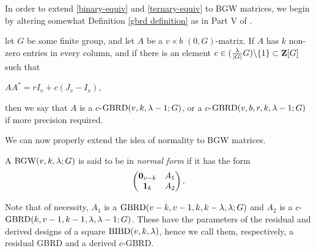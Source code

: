 \documentclass[../../../main]{subfiles}
\begin{document}
 In order to extend \ref{binary-equiv} and \ref{ternary-equiv} to BGW matrices, we begin by altering somewhat Definition \ref{gbrd definition} as in Part V of \cite{handbook}.
 
 \begin{defin}\label{c-gbrd defintion}
  let $G$ be some finite group, and let $A$ be a $v \times b$ $(0,G)$-matrix. If $A$ has $k$ non-zero entries in every column, and if there is an element $c \in (\frac{\lambda}{|G|}G)\backslash\{1\} \subset \mathbf{Z}[G]$ such that
  \begin{defenum}
   \item\label{c-gbrd-eq} $AA^* = rI_v + c(J_v - I_v)$,
  \end{defenum}
  then we say that $A$ is a $c$-$\text{GBRD}(v,k,\lambda-1;G)$, or a $c$-$\text{GBRD}(v,b,r,k,\lambda-1;G)$ if more precision required.
 \end{defin}
 
 We can now properly extend the idea of normality to BGW matrices.
 
 \begin{defin}
  A $\text{BGW}(v,k,\lambda;G)$ is said to be in {\it normal form} if it has the form
  \begin{equation}
   \begin{pmatrix}
    \mathbf{0}_{v-k} & A_1 \\ \mathbf{1}_{k} & A_2
   \end{pmatrix}.
  \end{equation}
 \end{defin}
 
 Note that of necessity, $A_1$ is a $\text{GBRD}(v-k,v-1,k,k-\lambda,\lambda;G)$ and $A_2$ is a $c$-$\text{GBRD}(k,v-1,k-1,\lambda,\lambda-1;G)$. These have the parameters of the residual and derived designs of a square $\text{BIBD}(v,k,\lambda)$, hence we call them, respectively, a residual GBRD and a derived $c$-GBRD.
 
 \biblio
\end{document}
